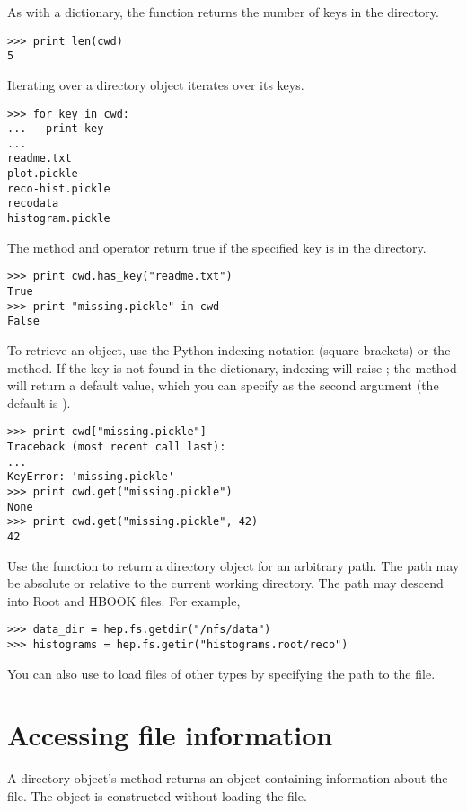 As with a dictionary, the  function returns the number of
keys in the directory.  
\begin{verbatim}
>>> print len(cwd)
5
\end{verbatim}
Iterating over a directory object iterates over its keys.  
\begin{verbatim}
>>> for key in cwd:
...   print key
...
readme.txt
plot.pickle
reco-hist.pickle
recodata
histogram.pickle
\end{verbatim}
The  method and  operator return true if the
specified key is in the directory.
\begin{verbatim}
>>> print cwd.has_key("readme.txt")
True
>>> print "missing.pickle" in cwd
False
\end{verbatim}

To retrieve an object, use the Python indexing notation (square
brackets) or the  method.  If the key is not found in the
dictionary, indexing will raise ; the 
method will return a default value, which you can specify as the second
argument (the default is ).
\begin{verbatim}
>>> print cwd["missing.pickle"]
Traceback (most recent call last):
...
KeyError: 'missing.pickle'
>>> print cwd.get("missing.pickle")
None
>>> print cwd.get("missing.pickle", 42)
42
\end{verbatim}

Use the  function to return a directory object
for an arbitrary path.  The path may be absolute or relative to the
current working directory.  The path may descend into Root and HBOOK
files.  For example,
\begin{verbatim}
>>> data_dir = hep.fs.getdir("/nfs/data")
>>> histograms = hep.fs.getir("histograms.root/reco")
\end{verbatim}
You can also use  to load files of other types by
specifying the path to the file.


\section{Accessing file information}

A directory object's  method returns an 
object containing information about the file.  The  object
is constructed without loading the file.


